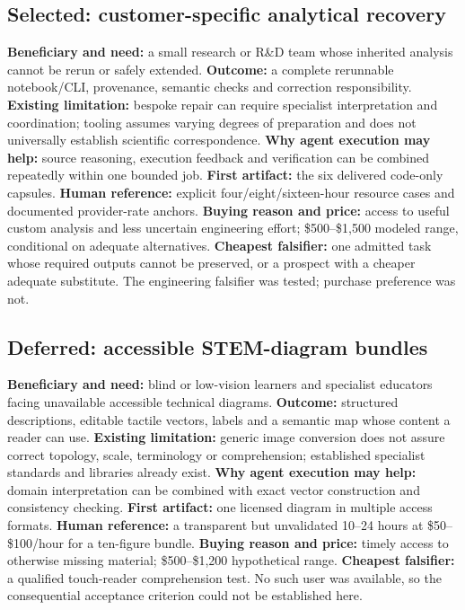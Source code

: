 \subsection{Selected: customer-specific analytical recovery}
\textbf{Beneficiary and need:} a small research or R\&D team whose inherited analysis cannot be rerun or safely extended. \textbf{Outcome:} a complete rerunnable notebook/CLI, provenance, semantic checks and correction responsibility. \textbf{Existing limitation:} bespoke repair can require specialist interpretation and coordination; tooling assumes varying degrees of preparation and does not universally establish scientific correspondence. \textbf{Why agent execution may help:} source reasoning, execution feedback and verification can be combined repeatedly within one bounded job. \textbf{First artifact:} the six delivered code-only capsules. \textbf{Human reference:} explicit four/eight/sixteen-hour resource cases and documented provider-rate anchors. \textbf{Buying reason and price:} access to useful custom analysis and less uncertain engineering effort; \$500--\$1,500 modeled range, conditional on adequate alternatives. \textbf{Cheapest falsifier:} one admitted task whose required outputs cannot be preserved, or a prospect with a cheaper adequate substitute. The engineering falsifier was tested; purchase preference was not.

\subsection{Deferred: accessible STEM-diagram bundles}
\textbf{Beneficiary and need:} blind or low-vision learners and specialist educators facing unavailable accessible technical diagrams. \textbf{Outcome:} structured descriptions, editable tactile vectors, labels and a semantic map whose content a reader can use. \textbf{Existing limitation:} generic image conversion does not assure correct topology, scale, terminology or comprehension; established specialist standards and libraries already exist. \textbf{Why agent execution may help:} domain interpretation can be combined with exact vector construction and consistency checking. \textbf{First artifact:} one licensed diagram in multiple access formats. \textbf{Human reference:} a transparent but unvalidated 10--24 hours at \$50--\$100/hour for a ten-figure bundle. \textbf{Buying reason and price:} timely access to otherwise missing material; \$500--\$1,200 hypothetical range. \textbf{Cheapest falsifier:} a qualified touch-reader comprehension test. No such user was available, so the consequential acceptance criterion could not be established here.

